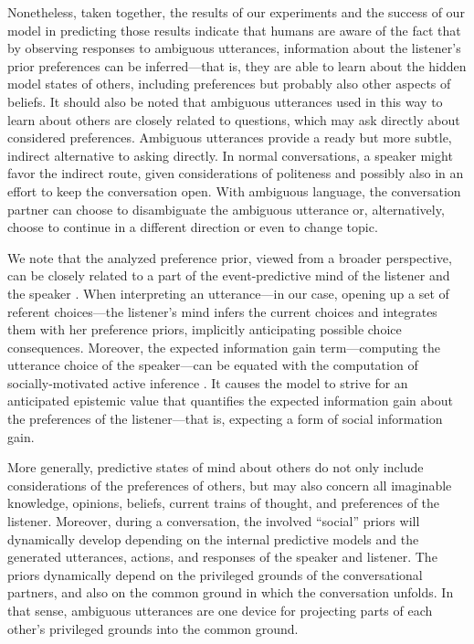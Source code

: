 \documentclass[10pt,a4paper]{article}
\begin{document}
Nonetheless, taken together, the results of our experiments and the success of our model in predicting those results indicate that humans are aware of the fact that by observing responses to ambiguous utterances, information about the listener's prior preferences can be inferred---that is, they are able to learn about the hidden model states of others, including preferences but probably also other aspects of beliefs. 
It should also be noted that ambiguous utterances used in this way to learn about others are closely related to questions, which may ask directly about considered preferences. 
Ambiguous utterances provide a ready but more subtle, indirect alternative to asking directly. 
In normal conversations, a speaker might favor the indirect route, given considerations of politeness and possibly also in an effort to keep the conversation open. 
With ambiguous language, the conversation partner can choose to disambiguate the ambiguous utterance or, alternatively, choose to continue in a different direction or even to change topic.


We note that the analyzed preference prior, viewed from a broader perspective, can be closely related to a part of the event-predictive mind of the listener and the speaker \cite{Butz:2016,Butz:2017}. 
When interpreting an utterance---in our case, opening up a set of referent choices---the listener's mind infers the current choices and integrates them with her preference priors, implicitly anticipating possible choice consequences.
Moreover, the expected information gain term---computing the utterance choice of the speaker---can be equated with the computation of socially-motivated active inference \cite{Butz:2017a,Friston:2015}.
It causes the model to strive for an anticipated epistemic value that quantifies the expected information gain about the preferences of the listener---that is, expecting a form of social information gain. 


More generally, predictive states of mind about others do not only include considerations of the preferences of others, but may also concern all imaginable knowledge, opinions, beliefs, current trains of thought, and preferences of the listener.
Moreover, during a conversation, the involved ``social'' priors will dynamically develop depending on the internal predictive models and the generated utterances, actions, and responses of the speaker and listener. 
The priors dynamically depend on the privileged grounds of the conversational partners, and also on the common ground in which the conversation unfolds.
In that sense, ambiguous utterances are one device for projecting parts of each other's privileged grounds into the common ground. 
\end{document}

